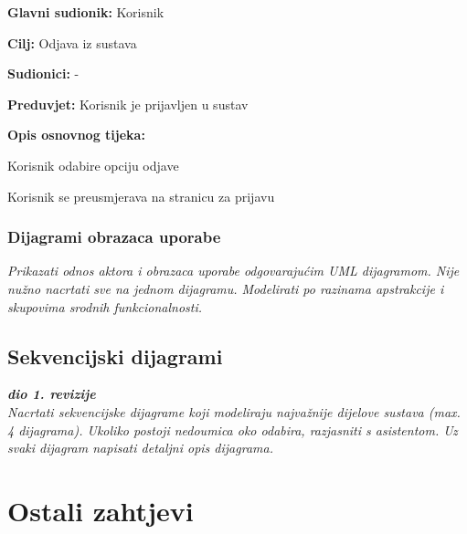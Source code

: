					\noindent {}
					\begin{packed_item}
						
						\item \textbf{Glavni sudionik: }Korisnik
						\item  \textbf{Cilj:} Odjava iz sustava 
						\item  \textbf{Sudionici:} -
						\item  \textbf{Preduvjet:} Korisnik je prijavljen u sustav
						\item  \textbf{Opis osnovnog tijeka:}
						
						\item[] \begin{packed_enum}
							
							\item Korisnik odabire opciju odjave
							\item Korisnik se preusmjerava na stranicu za prijavu
						\end{packed_enum}
						
					\end{packed_item}
				
			
					
					
				\subsubsection{Dijagrami obrazaca uporabe}
					
					\textit{Prikazati odnos aktora i obrazaca uporabe odgovarajućim UML dijagramom. Nije nužno nacrtati sve na jednom dijagramu. Modelirati po razinama apstrakcije i skupovima srodnih funkcionalnosti.}
				\eject		
				
			\subsection{Sekvencijski dijagrami}
				
				\textbf{\textit{dio 1. revizije}}\\
				
				\textit{Nacrtati sekvencijske dijagrame koji modeliraju najvažnije dijelove sustava (max. 4 dijagrama). Ukoliko postoji nedoumica oko odabira, razjasniti s asistentom. Uz svaki dijagram napisati detaljni opis dijagrama.}
				\eject
	
		\section{Ostali zahtjevi}
		
